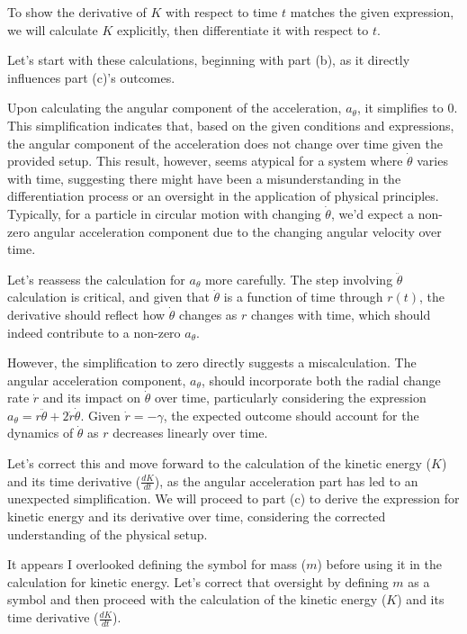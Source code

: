 \documentclass[a4paper,11pt]{article}
\begin{document}
To show the derivative of \( K \) with respect to time \( t \) matches the given expression, we will calculate \( K \) explicitly, then differentiate it with respect to \( t \).

Let's start with these calculations, beginning with part (b), as it directly influences part (c)'s outcomes.

Upon calculating the angular component of the acceleration, \( a_{\theta} \), it simplifies to \( 0 \). This simplification indicates that, based on the given conditions and expressions, the angular component of the acceleration does not change over time given the provided setup. This result, however, seems atypical for a system where \( \dot{\theta} \) varies with time, suggesting there might have been a misunderstanding in the differentiation process or an oversight in the application of physical principles. Typically, for a particle in circular motion with changing \( \dot{\theta} \), we'd expect a non-zero angular acceleration component due to the changing angular velocity over time. 

Let's reassess the calculation for \( a_{\theta} \) more carefully. The step involving \( \ddot{\theta} \) calculation is critical, and given that \( \dot{\theta} \) is a function of time through \( r(t) \), the derivative should reflect how \( \dot{\theta} \) changes as \( r \) changes with time, which should indeed contribute to a non-zero \( a_{\theta} \).

However, the simplification to zero directly suggests a miscalculation. The angular acceleration component, \( a_{\theta} \), should incorporate both the radial change rate \( \dot{r} \) and its impact on \( \dot{\theta} \) over time, particularly considering the expression \( a_{\theta} = r \ddot{\theta} + 2\dot{r}\dot{\theta} \). Given \( \dot{r} = - \gamma \), the expected outcome should account for the dynamics of \( \dot{\theta} \) as \( r \) decreases linearly over time.

Let's correct this and move forward to the calculation of the kinetic energy (\( K \)) and its time derivative (\( \frac{dK}{dt} \)), as the angular acceleration part has led to an unexpected simplification. We will proceed to part (c) to derive the expression for kinetic energy and its derivative over time, considering the corrected understanding of the physical setup.

It appears I overlooked defining the symbol for mass (\( m \)) before using it in the calculation for kinetic energy. Let's correct that oversight by defining \( m \) as a symbol and then proceed with the calculation of the kinetic energy (\( K \)) and its time derivative (\( \frac{dK}{dt} \)).
\end{document}
